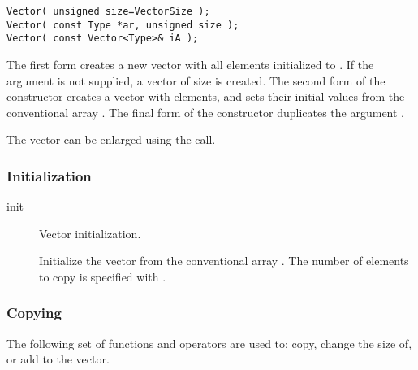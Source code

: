 \begin{verbatim}
Vector( unsigned size=VectorSize );
Vector( const Type *ar, unsigned size );
Vector( const Vector<Type>& iA );
\end{verbatim}

The first form creates a new vector with all  elements
initialized to .  If the argument  is not supplied,
a vector of size  is created.  The second form of the
constructor creates a vector with  elements, and sets their
initial values from the conventional array .  The final form
of the constructor duplicates the argument .

The vector can be enlarged using the  call.

\subsubsection{Initialization}
\begin{description}

\item[init] \texonly{---} Vector initialization.\\

Initialize the vector from the conventional array .  The
number of elements to copy is specified with .
\end{description}

\subsubsection{Copying}
\label{sec:vector-copying}

The following set of functions and operators are used to: copy, change the
size of, or add to the vector.  

